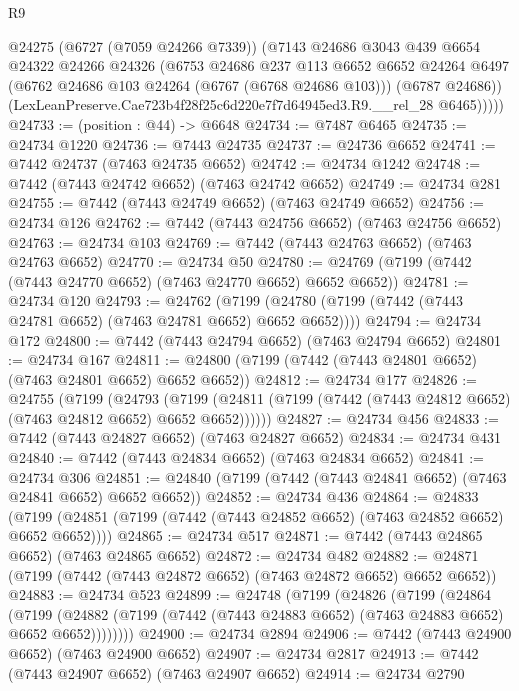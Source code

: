 \begin{lexlean}{R9}
\begin{coremodule}
          @24275
          (@6727 (@7059 @24266 @7339))
          (@7143
            @24686
            @3043
            @439
            @6654
            @24322
            @24266
            @24326
            (@6753
              @24686
              @237
              @113
              @6652
              @6652
              @24264
              @6497
              (@6762 @24686 @103 @24264 (@6767 (@6768 @24686 @103)))
              (@6787 @24686))
            (LexLeanPreserve.Cae723b4f28f25c6d220e7f7d64945ed3.R9.__rel_28 @6465)))))
@24733 := (position : @44) -> @6648
@24734 := @7487 @6465
@24735 := @24734 @1220
@24736 := @7443 @24735
@24737 := @24736 @6652
@24741 := @7442 @24737 (@7463 @24735 @6652)
@24742 := @24734 @1242
@24748 := @7442 (@7443 @24742 @6652) (@7463 @24742 @6652)
@24749 := @24734 @281
@24755 := @7442 (@7443 @24749 @6652) (@7463 @24749 @6652)
@24756 := @24734 @126
@24762 := @7442 (@7443 @24756 @6652) (@7463 @24756 @6652)
@24763 := @24734 @103
@24769 := @7442 (@7443 @24763 @6652) (@7463 @24763 @6652)
@24770 := @24734 @50
@24780 := @24769 (@7199 (@7442 (@7443 @24770 @6652) (@7463 @24770 @6652) @6652 @6652))
@24781 := @24734 @120
@24793 := @24762
    (@7199 (@24780 (@7199 (@7442 (@7443 @24781 @6652) (@7463 @24781 @6652) @6652 @6652))))
@24794 := @24734 @172
@24800 := @7442 (@7443 @24794 @6652) (@7463 @24794 @6652)
@24801 := @24734 @167
@24811 := @24800 (@7199 (@7442 (@7443 @24801 @6652) (@7463 @24801 @6652) @6652 @6652))
@24812 := @24734 @177
@24826 := @24755
    (@7199
      (@24793
        (@7199 (@24811 (@7199 (@7442 (@7443 @24812 @6652) (@7463 @24812 @6652) @6652 @6652))))))
@24827 := @24734 @456
@24833 := @7442 (@7443 @24827 @6652) (@7463 @24827 @6652)
@24834 := @24734 @431
@24840 := @7442 (@7443 @24834 @6652) (@7463 @24834 @6652)
@24841 := @24734 @306
@24851 := @24840 (@7199 (@7442 (@7443 @24841 @6652) (@7463 @24841 @6652) @6652 @6652))
@24852 := @24734 @436
@24864 := @24833
    (@7199 (@24851 (@7199 (@7442 (@7443 @24852 @6652) (@7463 @24852 @6652) @6652 @6652))))
@24865 := @24734 @517
@24871 := @7442 (@7443 @24865 @6652) (@7463 @24865 @6652)
@24872 := @24734 @482
@24882 := @24871 (@7199 (@7442 (@7443 @24872 @6652) (@7463 @24872 @6652) @6652 @6652))
@24883 := @24734 @523
@24899 := @24748
    (@7199
      (@24826
        (@7199
          (@24864
            (@7199
              (@24882 (@7199 (@7442 (@7443 @24883 @6652) (@7463 @24883 @6652) @6652 @6652))))))))
@24900 := @24734 @2894
@24906 := @7442 (@7443 @24900 @6652) (@7463 @24900 @6652)
@24907 := @24734 @2817
@24913 := @7442 (@7443 @24907 @6652) (@7463 @24907 @6652)
@24914 := @24734 @2790

\end{coremodule}
\end{lexlean}
